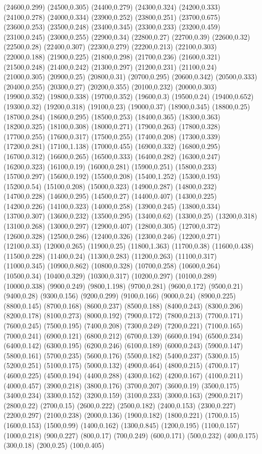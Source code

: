 (24600,0.299)
(24500,0.305)
(24400,0.279)
(24300,0.324)
(24200,0.333)
(24100,0.278)
(24000,0.334)
(23900,0.252)
(23800,0.251)
(23700,0.675)
(23600,0.253)
(23500,0.248)
(23400,0.345)
(23300,0.233)
(23200,0.459)
(23100,0.245)
(23000,0.255)
(22900,0.34)
(22800,0.27)
(22700,0.39)
(22600,0.32)
(22500,0.28)
(22400,0.307)
(22300,0.279)
(22200,0.213)
(22100,0.303)
(22000,0.188)
(21900,0.225)
(21800,0.298)
(21700,0.236)
(21600,0.321)
(21500,0.248)
(21400,0.242)
(21300,0.297)
(21200,0.231)
(21100,0.24)
(21000,0.305)
(20900,0.25)
(20800,0.31)
(20700,0.295)
(20600,0.342)
(20500,0.333)
(20400,0.255)
(20300,0.27)
(20200,0.355)
(20100,0.232)
(20000,0.303)
(19900,0.352)
(19800,0.338)
(19700,0.352)
(19600,0.3)
(19500,0.24)
(19400,0.652)
(19300,0.32)
(19200,0.318)
(19100,0.23)
(19000,0.37)
(18900,0.345)
(18800,0.25)
(18700,0.284)
(18600,0.295)
(18500,0.253)
(18400,0.365)
(18300,0.363)
(18200,0.325)
(18100,0.308)
(18000,0.271)
(17900,0.263)
(17800,0.328)
(17700,0.255)
(17600,0.317)
(17500,0.255)
(17400,0.208)
(17300,0.339)
(17200,0.281)
(17100,1.138)
(17000,0.455)
(16900,0.332)
(16800,0.295)
(16700,0.312)
(16600,0.265)
(16500,0.333)
(16400,0.282)
(16300,0.247)
(16200,0.323)
(16100,0.19)
(16000,0.281)
(15900,0.251)
(15800,0.233)
(15700,0.297)
(15600,0.192)
(15500,0.208)
(15400,1.252)
(15300,0.193)
(15200,0.54)
(15100,0.208)
(15000,0.323)
(14900,0.287)
(14800,0.232)
(14700,0.228)
(14600,0.295)
(14500,0.27)
(14400,0.407)
(14300,0.225)
(14200,0.226)
(14100,0.323)
(14000,0.258)
(13900,0.245)
(13800,0.334)
(13700,0.307)
(13600,0.232)
(13500,0.295)
(13400,0.62)
(13300,0.25)
(13200,0.318)
(13100,0.268)
(13000,0.297)
(12900,0.407)
(12800,0.305)
(12700,0.372)
(12600,0.328)
(12500,0.286)
(12400,0.326)
(12300,0.246)
(12200,0.271)
(12100,0.33)
(12000,0.265)
(11900,0.25)
(11800,1.363)
(11700,0.38)
(11600,0.438)
(11500,0.228)
(11400,0.24)
(11300,0.283)
(11200,0.263)
(11100,0.317)
(11000,0.345)
(10900,0.862)
(10800,0.328)
(10700,0.258)
(10600,0.264)
(10500,0.34)
(10400,0.329)
(10300,0.317)
(10200,0.297)
(10100,0.289)
(10000,0.338)
(9900,0.249)
(9800,1.198)
(9700,0.281)
(9600,0.172)
(9500,0.21)
(9400,0.28)
(9300,0.156)
(9200,0.299)
(9100,0.166)
(9000,0.24)
(8900,0.225)
(8800,0.145)
(8700,0.168)
(8600,0.237)
(8500,0.188)
(8400,0.243)
(8300,0.206)
(8200,0.178)
(8100,0.273)
(8000,0.192)
(7900,0.172)
(7800,0.213)
(7700,0.171)
(7600,0.245)
(7500,0.195)
(7400,0.208)
(7300,0.249)
(7200,0.221)
(7100,0.165)
(7000,0.241)
(6900,0.121)
(6800,0.212)
(6700,0.139)
(6600,0.194)
(6500,0.234)
(6400,0.142)
(6300,0.195)
(6200,0.246)
(6100,0.189)
(6000,0.243)
(5900,0.147)
(5800,0.161)
(5700,0.235)
(5600,0.176)
(5500,0.182)
(5400,0.237)
(5300,0.15)
(5200,0.251)
(5100,0.175)
(5000,0.132)
(4900,0.464)
(4800,0.215)
(4700,0.17)
(4600,0.225)
(4500,0.194)
(4400,0.288)
(4300,0.162)
(4200,0.167)
(4100,0.211)
(4000,0.457)
(3900,0.218)
(3800,0.176)
(3700,0.207)
(3600,0.19)
(3500,0.175)
(3400,0.234)
(3300,0.152)
(3200,0.159)
(3100,0.233)
(3000,0.163)
(2900,0.217)
(2800,0.22)
(2700,0.15)
(2600,0.222)
(2500,0.182)
(2400,0.153)
(2300,0.227)
(2200,0.297)
(2100,0.238)
(2000,0.136)
(1900,0.182)
(1800,0.221)
(1700,0.15)
(1600,0.153)
(1500,0.99)
(1400,0.162)
(1300,0.845)
(1200,0.195)
(1100,0.157)
(1000,0.218)
(900,0.227)
(800,0.17)
(700,0.249)
(600,0.171)
(500,0.232)
(400,0.175)
(300,0.18)
(200,0.25)
(100,0.405)
